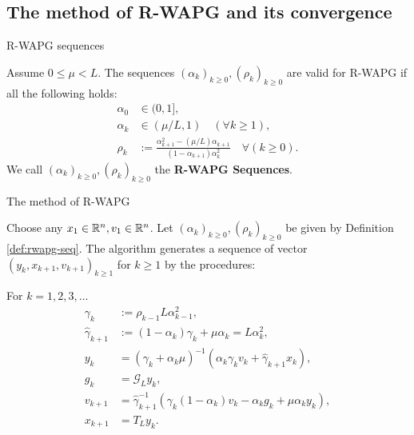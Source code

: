 \documentclass[11pt]{beamer}
\theoremstyle{definition}
\begin{document}
    \subsection{The method of R-WAPG and its convergence}
        \begin{frame}{R-WAPG sequences}
            \begin{definition}\label{def:rwapg-seq}
                Assume $0 \le \mu < L$. 
                The sequences $(\alpha_k)_{k \ge 0}, (\rho_k)_{k \ge 0}$ are valid for R-WAPG if all the following holds: 
                \begin{align*}
                    \alpha_0 &\in (0, 1], 
                    \\
                    \alpha_k &\in (\mu/L, 1) \quad (\forall k \ge 1), 
                    \\
                    \rho_k &:= \frac{\alpha_{k + 1}^2 - (\mu/L)\alpha_{k + 1}}{(1 - \alpha_{k + 1})\alpha_k^2} \quad \forall (k \ge 0). 
                \end{align*}
                We call $(\alpha_k)_{k \ge 0}, (\rho_k)_{k \ge 0}$ the \textbf{R-WAPG Sequences}. 
            \end{definition}
        \end{frame}
        \begin{frame}{The method of R-WAPG}
            \begin{definition}\label{def:wapg}
                Choose any $x_1 \in \mathbb R^n, v_1 \in \mathbb R^n$. 
                Let $(\alpha_k)_{k \ge0}, (\rho_k)_{k \ge 0}$ be given by Definition \ref{def:rwapg-seq}. 
                The algorithm generates a sequence of vector $(y_k, x_{k + 1}, v_{k + 1})_{k \ge 1}$ for $k\ge 1$ by the procedures:  
                {\small
                \begin{tcolorbox}
                    For $k=1, 2, 3, \ldots$
                    \begin{align*}
                        \gamma_k &:= \rho_{k -1}L\alpha_{k - 1}^2, 
                        \\
                        \hat \gamma_{k + 1} & := (1 - \alpha_k)\gamma_k + \mu \alpha_k = L\alpha_k^2, 
                        \\
                        y_k &= 
                        (\gamma_k + \alpha_k \mu)^{-1}(\alpha_k \gamma_k v_k + \hat\gamma_{k + 1} x_k), 
                        \\
                        g_k &= \mathcal G_L y_k, 
                        \\
                        v_{k + 1} &= 
                        \hat\gamma^{-1}_{k + 1}
                        (\gamma_k(1 - \alpha_k) v_k - \alpha_k g_k + \mu \alpha_k y_k), 
                        \\
                        x_{k + 1} &= T_L y_k. 
                    \end{align*}    
                \end{tcolorbox}
                }
            \end{definition}
        \end{frame}
\end{document}
